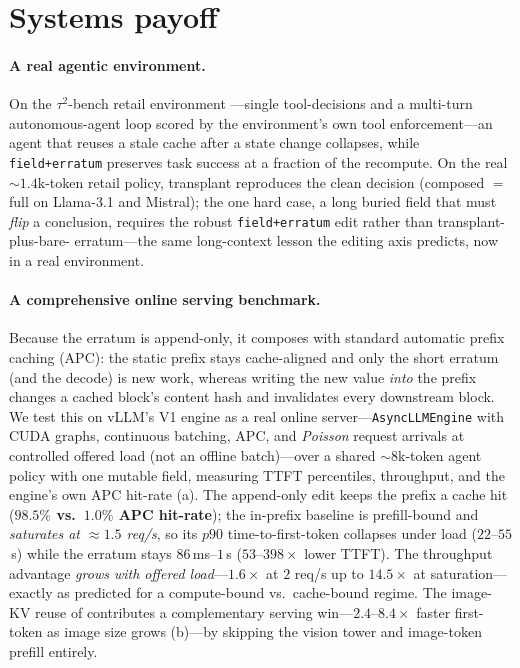 \section{Systems payoff}
\label{sec:systems}

\paragraph{A real agentic environment.} On the \(\tau^2\)-bench retail environment
\citep{barres2025tau2}---single tool-decisions
and a multi-turn autonomous-agent loop scored by the environment's own tool enforcement---an agent that
reuses a stale cache after a state change collapses, while \texttt{field+erratum} preserves task success at
a fraction of the recompute. On the real ${\sim}1.4$k-token retail policy, transplant reproduces the clean
decision (composed $=$ full on Llama-3.1 and Mistral); the one hard case, a long buried field that must
\emph{flip} a conclusion, requires the robust \texttt{field+erratum} edit rather than transplant-plus-bare-
erratum---the same long-context lesson the editing axis predicts, now in a real environment.

\paragraph{A comprehensive online serving benchmark.} Because the erratum is append-only, it composes
with standard automatic prefix caching (APC): the static prefix stays cache-aligned and only the short
erratum (and the decode) is new work, whereas writing the new value \emph{into} the prefix changes a cached
block's content hash and invalidates every downstream block. We test this on vLLM's V1 engine as a real
online server---\texttt{AsyncLLMEngine} with CUDA graphs, continuous batching, APC, and \emph{Poisson}
request arrivals at controlled offered load (not an offline batch)---over a shared ${\sim}8$k-token agent
policy with one mutable field, measuring TTFT percentiles, throughput, and the engine's own APC hit-rate
(a). The append-only edit keeps the prefix a cache hit (\textbf{$98.5\%$ vs.\ $1.0\%$ APC
hit-rate}); the in-prefix baseline is prefill-bound and \emph{saturates at ${\approx}1.5$ req/s}, so its
$p90$ time-to-first-token collapses under load ($22$--$55$\,s) while the erratum stays $86$\,ms--$1$\,s
($53$--$398\times$ lower TTFT). The throughput advantage \emph{grows with offered load}---$1.6\times$ at
$2$ req/s up to $\mathbf{14.5\times}$ at saturation---exactly as predicted for a compute-bound vs.\
cache-bound regime. The image-KV reuse of  contributes a complementary serving
win---$2.4$--$8.4\times$ faster first-token as image size grows (\Cref{fig:sys}b)---by skipping the vision
tower and image-token prefill entirely.


